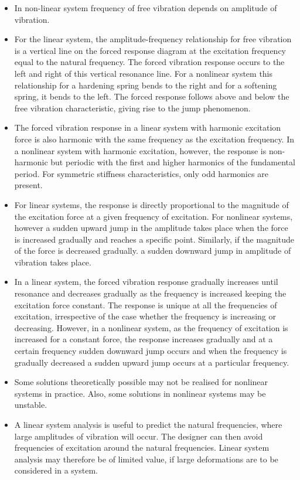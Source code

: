 \begin{itemize}
\item In non-linear system frequency of free vibration depends on amplitude of vibration.
\item For the linear system, the amplitude-frequency relationship for free vibration is a vertical line on the forced response diagram at the excitation frequency equal to the natural frequency. The forced vibration response occurs to the left and right of this vertical resonance line. For a nonlinear system this relationship for a hardening spring bends to the right and for a softening spring, it bends to the left. The forced response follows above and below the free vibration characteristic, giving rise to the jump phenomenon. 
\item The forced vibration response in a linear system with harmonic excitation force is also harmonic with the same frequency as the excitation frequency. In a nonlinear system with harmonic excitation, however, the response is non-harmonic but periodic with the first and higher harmonics of the fundamental period. For symmetric stiffness characteristics, only odd harmonics are present.
\item  For linear systems, the response is directly proportional to the magnitude of the excitation force at a given frequency of excitation. For nonlinear systems, however a sudden upward jump in the amplitude takes place when the force is increased gradually and reaches a specific point. Similarly, if the magnitude of the force is decreased gradually. a sudden downward jump in amplitude of vibration takes place.
\item In a linear system, the forced vibration response gradually increases until resonance and decreases gradually as the frequency is increased keeping the excitation force constant. The response is unique at all the frequencies of excitation, irrespective of the case whether the frequency is increasing or decreasing. However, in a nonlinear system, as the frequency of excitation is increased for a constant force, the response increases gradually and at a certain frequency sudden downward jump occurs and when the frequency is gradually decreased a sudden upward jump occurs at a particular frequency. 
\item Some solutions theoretically possible may not be realised for nonlinear systems in practice. Also, some solutions in nonlinear systems may be unstable.
\item  A linear system analysis is useful to predict the natural frequencies, where large amplitudes of vibration will occur. The designer can then avoid frequencies of excitation around the natural frequencies. Linear system analysis may therefore be of limited value, if large deformations are to be considered in a system.
\end{itemize}

